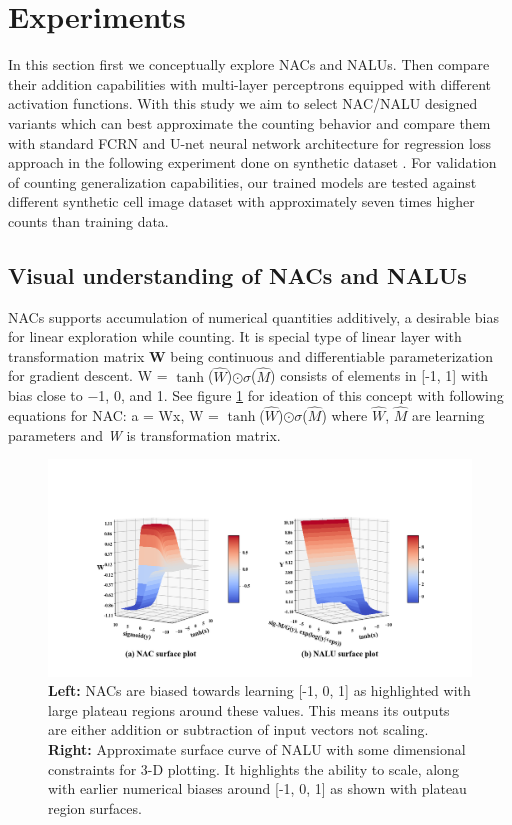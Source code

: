 \documentclass[runningheads]{llncs}
\begin{document}
\section{Experiments}

In this section first we conceptually explore NACs and NALUs. Then compare their addition capabilities with multi-layer perceptrons equipped with different activation functions. With this study we aim to select NAC/NALU designed variants which can best approximate the counting behavior and compare them with standard FCRN and U-net neural network architecture for regression loss approach in the following experiment done on synthetic dataset \cite{b29}. For validation of counting generalization capabilities, our trained models are tested against different synthetic cell image dataset with approximately seven times higher counts than training data.

\subsection{Visual understanding of NACs and NALUs}


NACs \cite{b7} supports accumulation of numerical quantities additively, a desirable bias for linear exploration while counting. It is special type of linear layer with transformation matrix \textbf{W} being continuous and differentiable parameterization for gradient descent. W = $\tanh$($\hat{W}$)$\odot$$\sigma$($\hat{M}$)  consists of elements in [-1, 1] with bias close to  −1, 0, and 1. See figure \ref{fig3} for ideation of this concept with following equations for NAC:  a = Wx, W = $\tanh$($\hat{W}$)$\odot$$\sigma$($\hat{M}$) where \textit{$\hat{W}$}, \textit{$\hat{M}$} are learning parameters and \textit{W} is transformation matrix.

\begin{figure}[!h]
\centering
\includegraphics[width=1.0\textwidth]{nac-nalu-comparison.png}
\caption{
\textbf{Left:} NACs are biased towards learning [-1, 0, 1] as highlighted with large plateau regions around these values. This means its outputs are either addition or subtraction of input vectors not scaling.
\textbf{Right:} Approximate surface curve of NALU with some dimensional constraints for 3-D plotting. It highlights the ability to scale, along with earlier numerical biases around [-1, 0, 1] as shown with plateau region surfaces.}
\label{fig3}
\end{figure}
\end{document}
